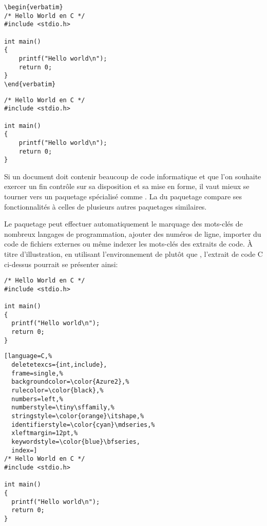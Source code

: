 \begin{demo}
  \begin{texample}
\begin{lstlisting}[deletetexcs={int,include}]
\begin{verbatim}
/* Hello World en C */
#include <stdio.h>

int main()
{
    printf("Hello world\n");
    return 0;
}
\end{verbatim}
\end{lstlisting}
    \producing
\begin{verbatim}
/* Hello World en C */
#include <stdio.h>

int main()
{
    printf("Hello world\n");
    return 0;
}
\end{verbatim}
  \end{texample}
\end{demo}

Si un document doit contenir beaucoup de code informatique et que l'on
souhaite exercer un fin contrôle sur sa disposition et sa mise en
forme, il vaut mieux se tourner vers un paquetage spécialisé comme
 \citep{listings}. La %
du paquetage compare ses fonctionnalités à celles de plusieurs autres
paquetages similaires.

Le paquetage  peut effectuer automatiquement le marquage
des mots-clés de nombreux langages de programmation, ajouter des
numéros de ligne, importer du code de fichiers externes ou même
indexer les mots-clés des extraits de code. À titre d'illustration, en
utilisant l'environnement  de  plutôt que
, l'extrait de code C ci-dessus pourrait se présenter
ainsi:
\begin{demo}
  \begin{texample}
    \begin{vglisting}
\begin{lstlisting}
/* Hello World en C */
#include <stdio.h>

int main()
{
  printf("Hello world\n");
  return 0;
}
\end{lstlisting}
    \end{vglisting}
    \producing
\begin{lstlisting}[language=C,%
  deletetexcs={int,include},
  frame=single,%
  backgroundcolor=\color{Azure2},%
  rulecolor=\color{black},%
  numbers=left,%
  numberstyle=\tiny\sffamily,%
  stringstyle=\color{orange}\itshape,%
  identifierstyle=\color{cyan}\mdseries,%
  xleftmargin=12pt,%
  keywordstyle=\color{blue}\bfseries,
  index=]
/* Hello World en C */
#include <stdio.h>

int main()
{
  printf("Hello world\n");
  return 0;
}
\end{lstlisting}
  \end{texample}
\end{demo}

